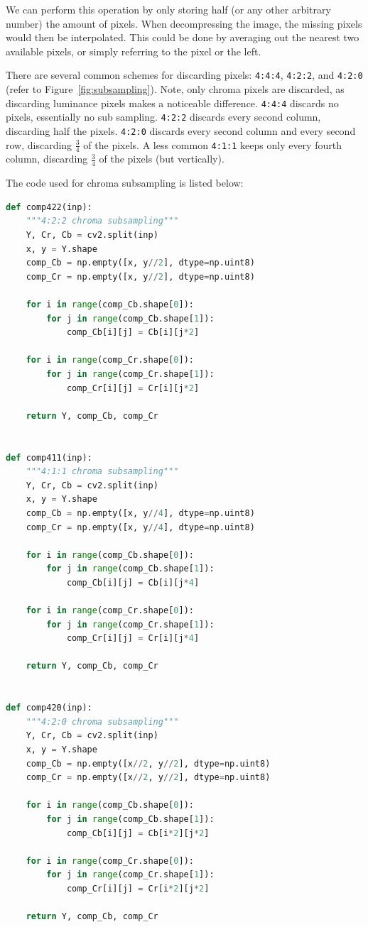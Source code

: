 \documentclass{article}
\begin{document}
We can perform this operation by only storing half (or any other arbitrary number) the amount of pixels.
When decompressing the image, the missing pixels would then be interpolated.
This could be done by averaging out the nearest two available pixels, or simply referring to the pixel or the left.

There are several common schemes for discarding pixels: \texttt{4:4:4}, \texttt{4:2:2}, and \texttt{4:2:0} (refer to Figure~\ref{fig:subsampling}).
Note, only chroma pixels are discarded, as discarding luminance pixels makes a noticeable difference.
\texttt{4:4:4} discards no pixels, essentially no sub sampling.
\texttt{4:2:2} discards every second column, discarding half the pixels.
\texttt{4:2:0} discards every second column and every second row, discarding $\frac{3}{4}$ of the pixels.
A less common \texttt{4:1:1} keeps only every fourth column, discarding $\frac{3}{4}$ of the pixels (but vertically).

The code used for chroma subsampling is listed below:
\begin{lstlisting}[language=Python]
def comp422(inp):
    """4:2:2 chroma subsampling"""
    Y, Cr, Cb = cv2.split(inp)
    x, y = Y.shape
    comp_Cb = np.empty([x, y//2], dtype=np.uint8)
    comp_Cr = np.empty([x, y//2], dtype=np.uint8)

    for i in range(comp_Cb.shape[0]):
        for j in range(comp_Cb.shape[1]):
            comp_Cb[i][j] = Cb[i][j*2]

    for i in range(comp_Cr.shape[0]):
        for j in range(comp_Cr.shape[1]):
            comp_Cr[i][j] = Cr[i][j*2]

    return Y, comp_Cb, comp_Cr


def comp411(inp):
    """4:1:1 chroma subsampling"""
    Y, Cr, Cb = cv2.split(inp)
    x, y = Y.shape
    comp_Cb = np.empty([x, y//4], dtype=np.uint8)
    comp_Cr = np.empty([x, y//4], dtype=np.uint8)

    for i in range(comp_Cb.shape[0]):
        for j in range(comp_Cb.shape[1]):
            comp_Cb[i][j] = Cb[i][j*4]

    for i in range(comp_Cr.shape[0]):
        for j in range(comp_Cr.shape[1]):
            comp_Cr[i][j] = Cr[i][j*4]

    return Y, comp_Cb, comp_Cr


def comp420(inp):
    """4:2:0 chroma subsampling"""
    Y, Cr, Cb = cv2.split(inp)
    x, y = Y.shape
    comp_Cb = np.empty([x//2, y//2], dtype=np.uint8)
    comp_Cr = np.empty([x//2, y//2], dtype=np.uint8)

    for i in range(comp_Cb.shape[0]):
        for j in range(comp_Cb.shape[1]):
            comp_Cb[i][j] = Cb[i*2][j*2]

    for i in range(comp_Cr.shape[0]):
        for j in range(comp_Cr.shape[1]):
            comp_Cr[i][j] = Cr[i*2][j*2]

    return Y, comp_Cb, comp_Cr
\end{lstlisting}
\end{document}
